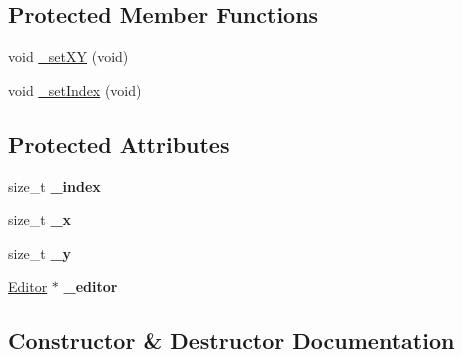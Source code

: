 \subsection*{Protected Member Functions}
\begin{DoxyCompactItemize}
\item 
void \hyperlink{classFleaux_1_1Cursor_a3a45b2bde24c3173e84b8097c789265b}{\+\_\+set\+X\+Y} (void)
\item 
void \hyperlink{classFleaux_1_1Cursor_a964ad98494b190af5fca13c8cbe69371}{\+\_\+set\+Index} (void)
\end{DoxyCompactItemize}
\subsection*{Protected Attributes}
\begin{DoxyCompactItemize}
\item 
\hypertarget{classFleaux_1_1Cursor_ac73c77f866d9fd3ce6ac74f458f899b5}{}size\+\_\+t {\bfseries \+\_\+index}\label{classFleaux_1_1Cursor_ac73c77f866d9fd3ce6ac74f458f899b5}

\item 
\hypertarget{classFleaux_1_1Cursor_acbb4e71f0e8fe82c57d4046d708e94c8}{}size\+\_\+t {\bfseries \+\_\+x}\label{classFleaux_1_1Cursor_acbb4e71f0e8fe82c57d4046d708e94c8}

\item 
\hypertarget{classFleaux_1_1Cursor_ae31481eee36242bfcb286fb03cb6c9d9}{}size\+\_\+t {\bfseries \+\_\+y}\label{classFleaux_1_1Cursor_ae31481eee36242bfcb286fb03cb6c9d9}

\item 
\hypertarget{classFleaux_1_1Cursor_ae65c902eba05392c7db5cb8956af441d}{}\hyperlink{classFleaux_1_1Editor}{Editor} $\ast$ {\bfseries \+\_\+editor}\label{classFleaux_1_1Cursor_ae65c902eba05392c7db5cb8956af441d}

\end{DoxyCompactItemize}


\subsection{Constructor \& Destructor Documentation}
\hypertarget{classFleaux_1_1Cursor_aa2811c8ebadd1b019a1d1099eb401e3b}{}
